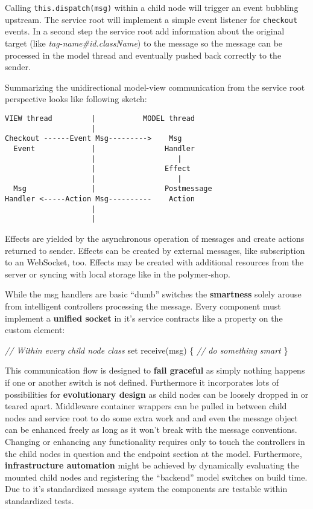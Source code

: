 \documentclass[]{article}
\newenvironment{Shaded}{}{}
\newcommand{\CommentTok}[1]{\textcolor[rgb]{0.38,0.63,0.69}{\textit{{#1}}}}
\newcommand{\OperatorTok}[1]{\textcolor[rgb]{0.40,0.40,0.40}{{#1}}}
\newcommand{\AttributeTok}[1]{\textcolor[rgb]{0.49,0.56,0.16}{{#1}}}
\newcommand{\NormalTok}[1]{{#1}}
\begin{document}
Calling \texttt{this.dispatch(msg)} within a child node will trigger an
event bubbling upstream. The service root will implement a simple event
listener for \texttt{checkout} events. In a second step the service root
add information about the original target (like
\emph{tag-name\#id.className}) to the message so the message can be
processed in the model thread and eventually pushed back correctly to
the sender.

Summarizing the unidirectional model-view communication from the service
root perspective looks like following sketch:

\begin{verbatim}
VIEW thread         |           MODEL thread
                    |
Checkout ------Event Msg--------->    Msg
  Event             |                Handler
                    |                   |
                    |                Effect
                    |                   |
  Msg               |                Postmessage
Handler <-----Action Msg----------    Action
                    |                   
                    |
\end{verbatim}

Effects are yielded by the asynchronous operation of messages and create
actions returned to sender. Effects can be created by external messages,
like subscription to an WebSocket, too. Effects may be created with
additional resources from the server or syncing with local storage like
in the polymer-shop.

While the msg handlers are basic ``dumb'' switches the
\textbf{smartness} solely arouse from intelligent controllers processing
the message. Every component must implement a \textbf{unified socket} in
it's service contracts like a property on the custom element:

\begin{Shaded}
\begin{Highlighting}[]
\CommentTok{// Within every child node class}
\NormalTok{set }\AttributeTok{receive}\NormalTok{(msg) }\OperatorTok{\{}
  \CommentTok{// do something smart}
\OperatorTok{\}}
\end{Highlighting}
\end{Shaded}

This communication flow is designed to \textbf{fail graceful} as simply
nothing happens if one or another switch is not defined. Furthermore it
incorporates lots of possibilities for \textbf{evolutionary design} as
child nodes can be loosely dropped in or teared apart. Middleware
container wrappers can be pulled in between child nodes and service root
to do some extra work and and even the message object can be enhanced
freely as long as it won't break with the message conventions. Changing
or enhancing any functionality requires only to touch the controllers in
the child nodes in question and the endpoint section at the model.
Furthermore, \textbf{infrastructure automation} might be achieved by
dynamically evaluating the mounted child nodes and registering the
``backend'' model switches on build time. Due to it's standardized
message system the components are testable within standardized tests.
\end{document}
